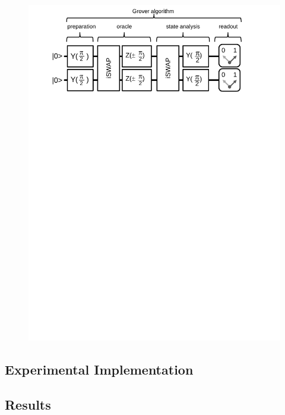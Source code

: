 
\begin{figure}
	\centering
		\includegraphics[width=1.\textwidth]{./material/papers/grover/figures/grover_algorithm_schematic}
	\label{fig:GroverAlgorithmSchematic}
	\caption{}
\end{figure}

\subsection{Experimental Implementation}


\subsection{Results}

